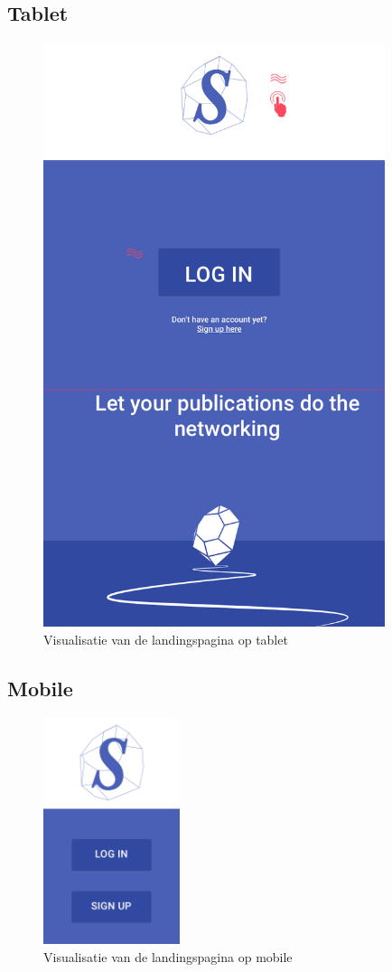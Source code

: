 \documentclass{article}
\begin{document}
\begin{appendices}
\subsection{Tablet}
\begin{figure}[!h]
\centering
 \includegraphics[width=100mm]{pieteruploads/SKRBL_FRNT_TabletPortrait.png}
 \caption{Visualisatie van de landingspagina op tablet }
\end{figure}
\clearpage


\subsection{Mobile}
\begin{figure}[!h]
\centering
 \includegraphics[width=40mm]{pieteruploads/SKRBL_FRNT_MobilePortrait.png}
 \caption{Visualisatie van de landingspagina op mobile }
\end{figure}


\end{appendices}
\end{document}

